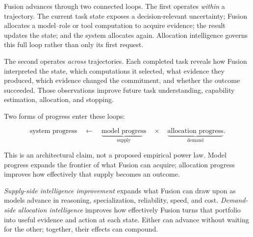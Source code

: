 Fusion advances through two connected loops. The first operates \emph{within}
a trajectory. The current task state exposes a decision-relevant uncertainty;
Fusion allocates a model--role or tool computation to acquire evidence; the
result updates the state; and the system allocates again. Allocation
intelligence governs this full loop rather than only its first request.

The second operates \emph{across} trajectories. Each completed task reveals how
Fusion interpreted the state, which computations it selected, what evidence
they produced, which evidence changed the commitment, and whether the outcome
succeeded. Those observations improve future task understanding, capability
estimation, allocation, and stopping.

Two forms of progress enter these loops:

\begin{equation}
  \text{system progress}
  \quad\longleftarrow\quad
  \underbrace{\text{model progress}}_{\text{supply}}
  \quad\times\quad
  \underbrace{\text{allocation progress}}_{\text{demand}}.
\end{equation}

This is an architectural claim, not a proposed empirical power law. Model
progress expands the frontier of what Fusion can acquire; allocation progress
improves how effectively that supply becomes an outcome.

\emph{Supply-side intelligence improvement} expands what Fusion can draw upon
as models advance in reasoning, specialization, reliability, speed, and cost.
\emph{Demand-side allocation intelligence} improves how effectively Fusion
turns that portfolio into useful evidence and action at each state. Either can
advance without waiting for the other; together, their effects can compound.


